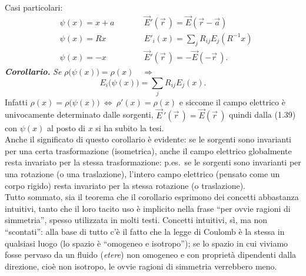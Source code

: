 Casi particolari:
\begin{equation}
  \begin{aligned}
    &\psi(x)=x+a&\qquad&\vec E'(\vec r\,)=\vec E(\vec r-\vec a)\\
    &\psi(x)=Rx&&E'_i(x)=\textstyle\sum_jR_{ij}E_j(R^{-1}x)\\
    &\psi(x)=-x&&\vec E'(\vec r\,)=-\vec E(-\vec r\,).
  \end{aligned}
  \tag{1.41}
\end{equation}
\textbf{\textit{Corollario.}} \textit{Se}
$\rho\big(\psi(x)\big)=\rho(x)\quad\Rightarrow$
\begin{equation}
  E_i\big(\psi(x)\big)=\textstyle\sum_jR_{ij}E_j(x).
  \tag{1.42}
\end{equation}
Infatti $\rho(x)=\rho\big(\psi(x)\big)\ \Leftrightarrow\ \rho'(x)=\rho(x)$ e
siccome il campo elettrico \`e univocamente determinato dalle sorgenti,
$\vec E\,'(\vec r\,)=\vec E(\vec r\,)$ quindi dalla (1.39) con $\psi(x)$ al
posto di $x$ si ha subito la tesi.\\
Anche il significato di questo corollario \`e evidente: se le sorgenti sono
invarianti per una
certa trasformazione (isometrica), anche il campo elettrico globalmente resta
invariato per la stessa trasformazione: p.es.\ se le sorgenti sono invarianti
per una rotazione (o una traslazione), l'intero campo elettrico (pensato come un
corpo rigido) resta invariato per la stessa rotazione (o traslazione).\\
Tutto sommato, sia il teorema che il corollario esprimono dei concetti
abbastanza intuitivi, tanto che il loro tacito uso \`e implicito nella frase
``per ovvie ragioni di simmetria'', spesso utilizzata in molti testi. Concetti
intuitivi, s\`i, ma non ``scontati'': alla base di tutto c'\`e il fatto che la
legge di Coulomb \`e la stessa in qualsiasi luogo (lo spazio \`e ``omogeneo e
isotropo''); se lo spazio in cui viviamo fosse pervaso da un fluido
(\emph{etere}) non omogeneo e con propriet\`a dipendenti dalla direzione, cio\`e
non isotropo, le ovvie ragioni di simmetria verrebbero meno.

